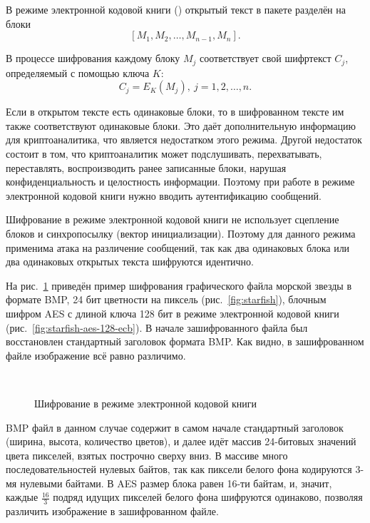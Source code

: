 В режиме электронной кодовой книги () открытый текст в пакете разделён на блоки
    \[ \left[ M_1, M_2, \dots, M_{n-1}, M_n \right]. \]

В процессе шифрования каждому блоку $M_j$ соответствует свой шифртекст $C_j$, определяемый с помощью ключа $K$:
    \[ C_j = E_K(M_j), ~ j = 1, 2, \dots, n. \]

Если в открытом тексте есть одинаковые блоки, то в шифрованном тексте им также соответствуют одинаковые блоки. Это даёт дополнительную информацию для криптоаналитика, что является недостатком этого режима. Другой недостаток состоит в том, что криптоаналитик может подслушивать, перехватывать, переставлять, воспроизводить ранее записанные блоки, нарушая конфиденциальность и целостность информации. Поэтому при работе в режиме электронной кодовой книги нужно вводить аутентификацию сообщений.

Шифрование в режиме электронной кодовой книги не использует сцепление блоков и синхропосылку (вектор инициализации). Поэтому для данного режима применима атака на различение сообщений, так как два одинаковых блока или два одинаковых открытых текста шифруются идентично.

На рис.~\ref{fig:ecb-demo} приведён пример шифрования графического файла морской звезды в формате BMP, 24 бит цветности на пиксель (рис.~\ref{fig:starfish}), блочным шифром AES с длиной ключа 128 бит в режиме электронной кодовой книги (рис.~\ref{fig:starfish-aes-128-ecb}). В начале зашифрованного файла был восстановлен стандартный заголовок формата BMP. Как видно, в зашифрованном файле изображение всё равно различимо.
\begin{figure}[!ht]
    \centering
    ~~~
    \caption{Шифрование в режиме электронной кодовой книги\label{fig:ecb-demo}}
\end{figure}
BMP файл в данном случае содержит в самом начале стандартный заголовок (ширина, высота, количество цветов), и далее идёт массив 24-битовых значений цвета пикселей, взятых построчно сверху вниз. В массиве много последовательностей нулевых байтов, так как пиксели белого фона кодируются 3-мя нулевыми байтами. В AES размер блока равен 16-ти байтам, и, значит, каждые $\frac{16}{3}$ подряд идущих пикселей белого фона шифруются одинаково, позволяя различить изображение в зашифрованном файле.

